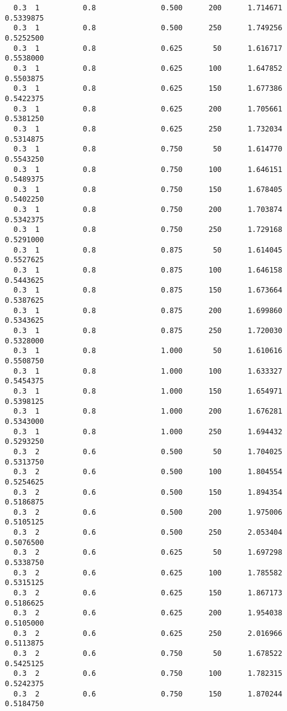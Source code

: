 \documentclass[
  letterpaper,
  DIV=11,
  numbers=noendperiod]{scrartcl}
\begin{document}
\begin{verbatim}
  0.3  1          0.8               0.500      200      1.714671  0.5339875
  0.3  1          0.8               0.500      250      1.749256  0.5252500
  0.3  1          0.8               0.625       50      1.616717  0.5538000
  0.3  1          0.8               0.625      100      1.647852  0.5503875
  0.3  1          0.8               0.625      150      1.677386  0.5422375
  0.3  1          0.8               0.625      200      1.705661  0.5381250
  0.3  1          0.8               0.625      250      1.732034  0.5314875
  0.3  1          0.8               0.750       50      1.614770  0.5543250
  0.3  1          0.8               0.750      100      1.646151  0.5489375
  0.3  1          0.8               0.750      150      1.678405  0.5402250
  0.3  1          0.8               0.750      200      1.703874  0.5342375
  0.3  1          0.8               0.750      250      1.729168  0.5291000
  0.3  1          0.8               0.875       50      1.614045  0.5527625
  0.3  1          0.8               0.875      100      1.646158  0.5443625
  0.3  1          0.8               0.875      150      1.673664  0.5387625
  0.3  1          0.8               0.875      200      1.699860  0.5343625
  0.3  1          0.8               0.875      250      1.720030  0.5328000
  0.3  1          0.8               1.000       50      1.610616  0.5508750
  0.3  1          0.8               1.000      100      1.633327  0.5454375
  0.3  1          0.8               1.000      150      1.654971  0.5398125
  0.3  1          0.8               1.000      200      1.676281  0.5343000
  0.3  1          0.8               1.000      250      1.694432  0.5293250
  0.3  2          0.6               0.500       50      1.704025  0.5313750
  0.3  2          0.6               0.500      100      1.804554  0.5254625
  0.3  2          0.6               0.500      150      1.894354  0.5186875
  0.3  2          0.6               0.500      200      1.975006  0.5105125
  0.3  2          0.6               0.500      250      2.053404  0.5076500
  0.3  2          0.6               0.625       50      1.697298  0.5338750
  0.3  2          0.6               0.625      100      1.785582  0.5315125
  0.3  2          0.6               0.625      150      1.867173  0.5186625
  0.3  2          0.6               0.625      200      1.954038  0.5105000
  0.3  2          0.6               0.625      250      2.016966  0.5113875
  0.3  2          0.6               0.750       50      1.678522  0.5425125
  0.3  2          0.6               0.750      100      1.782315  0.5242375
  0.3  2          0.6               0.750      150      1.870244  0.5184750

\end{verbatim}
\end{document}

